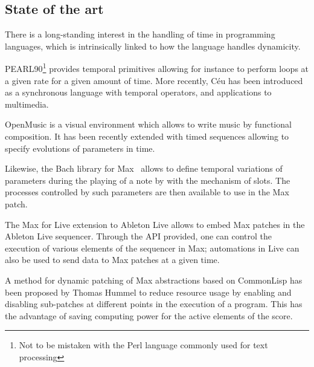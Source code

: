\documentclass{article}
\begin{document}

\subsection{State of the art}

There is a long-standing interest in the handling of time in programming languages, which is intrinsically linked to how the language handles dynamicity.

PEARL90\cite{halang2001safe}\footnote{Not to be mistaken with the Perl language commonly used for text processing} provides temporal primitives allowing for instance to perform loops at a given rate for a given amount of time.
More recently, Céu has been introduced as a synchronous language with temporal operators, and applications to multimedia\cite{Santos:2016:CLI:2976796.2976856}.

OpenMusic is a visual environment which allows to write music by functional composition.
It has been recently extended with timed sequences allowing to specify evolutions of parameters in time\cite{garcia:hal-01484077}.

Likewise, the Bach library for Max~\cite{agostini2015max} allows to define temporal variations of parameters during the playing of a note by with the mechanism of slots.
The processes controlled by such parameters are then available to use in the Max patch.

The Max for Live extension to Ableton Live allows to embed Max patches in the Ableton Live sequencer. 
Through the API provided, one can control the execution of various elements of the sequencer in Max; automations in Live can also be used to send data to Max patches at a given time.

A method for dynamic patching of Max abstractions based on CommonLisp has been proposed by Thomas Hummel\cite{hummel1994common} to reduce resource usage by enabling and disabling sub-patches at different points in the execution of a program.
This has the advantage of saving computing power for the active elements of the score.
\end{document}
